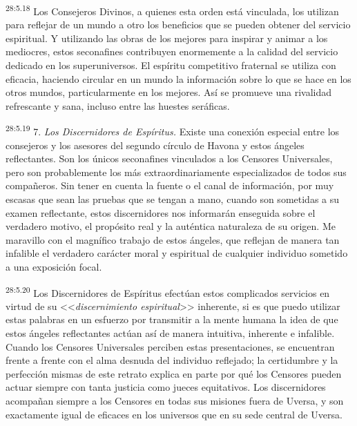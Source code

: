 \par
\textsuperscript{28:5.18} Los Consejeros Divinos, a quienes esta orden está vinculada, los utilizan para reflejar de un mundo a otro los beneficios que se pueden obtener del servicio espiritual. Y utilizando las obras de los mejores para inspirar y animar a los mediocres, estos seconafines contribuyen enormemente a la calidad del servicio dedicado en los superuniversos. El espíritu competitivo fraternal se utiliza con eficacia, haciendo circular en un mundo la información sobre lo que se hace en los otros mundos, particularmente en los mejores. Así se promueve una rivalidad refrescante y sana, incluso entre las huestes seráficas.

\par
\textsuperscript{28:5.19} 7. \textit{Los Discernidores de Espíritus.} Existe una conexión especial entre los consejeros y los asesores del segundo círculo de Havona y estos ángeles reflectantes. Son los únicos seconafines vinculados a los Censores Universales, pero son probablemente los más extraordinariamente especializados de todos sus compañeros. Sin tener en cuenta la fuente o el canal de información, por muy escasas que sean las pruebas que se tengan a mano, cuando son sometidas a su examen reflectante, estos discernidores nos informarán enseguida sobre el verdadero motivo, el propósito real y la auténtica naturaleza de su origen. Me maravillo con el magnífico trabajo de estos ángeles, que reflejan de manera tan infalible el verdadero carácter moral y espiritual de cualquier individuo sometido a una exposición focal.

\par
\textsuperscript{28:5.20} Los Discernidores de Espíritus efectúan estos complicados servicios en virtud de su <<\textit{discernimiento espiritual}>> inherente, si es que puedo utilizar estas palabras en un esfuerzo por transmitir a la mente humana la idea de que estos ángeles reflectantes actúan así de manera intuitiva, inherente e infalible. Cuando los Censores Universales perciben estas presentaciones, se encuentran frente a frente con el alma desnuda del individuo reflejado; la certidumbre y la perfección mismas de este retrato explica en parte por qué los Censores pueden actuar siempre con tanta justicia como jueces equitativos. Los discernidores acompañan siempre a los Censores en todas sus misiones fuera de Uversa, y son exactamente igual de eficaces en los universos que en su sede central de Uversa.


